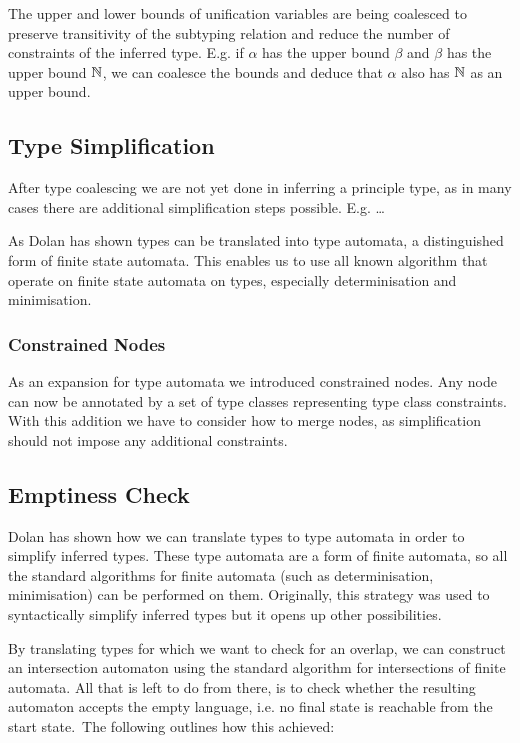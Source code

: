 The upper and lower bounds of unification variables are being coalesced to preserve transitivity of the subtyping relation and reduce the number of constraints of the inferred type.
E.g. if $\alpha$ has the upper bound $\beta$ and $\beta$ has the upper bound $\mathbb{N}$, we can coalesce the bounds and deduce that $\alpha$ also has $\mathbb{N}$ as an upper bound.

\subsection{Type Simplification}

After type coalescing we are not yet done in inferring a principle type, as in many cases there are additional simplification steps possible.
E.g. \dots

As Dolan has shown \cite{dolan2017subtyping} types can be translated into type automata, a distinguished form of finite state automata.
This enables us to use all known algorithm that operate on finite state automata on types, especially determinisation and minimisation.

\subsubsection{Constrained Nodes}

As an expansion for type automata we introduced constrained nodes.
Any node can now be annotated by a set of type classes representing type class constraints.
With this addition we have to consider how to merge nodes, as simplification should not impose any additional constraints.

\subsection{Emptiness Check}

Dolan \cite{downen2017phd} has shown how we can translate types to type automata in order to simplify inferred types.
These type automata are a form of finite automata, so all the standard algorithms for finite automata (such as determinisation, minimisation) can be performed on them.
Originally, this strategy was used to syntactically simplify inferred types but it opens up other possibilities.

By translating types for which we want to check for an overlap, we can construct an intersection automaton using the standard algorithm for intersections of finite automata.
All that is left to do from there, is to check whether the resulting automaton accepts the empty language,  i.e. no final state is reachable from the start state.\
The following outlines how this achieved:

